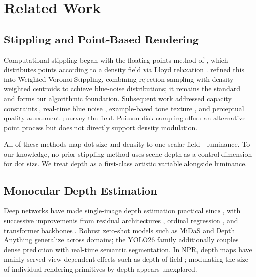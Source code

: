 \section{Related Work}
\label{sec:related}

\subsection{Stippling and Point-Based Rendering}

Computational stippling began with the floating-points method of
\citet{deussen2000floating}, which distributes points according to a
density field via Lloyd relaxation \citep{lloyd1982least}.
\citet{secord2002weighted} refined this into Weighted Voronoi
Stippling, combining rejection sampling with density-weighted
centroids to achieve blue-noise distributions; it remains the standard
and forms our algorithmic foundation. Subsequent work addressed
capacity constraints \citep{balzer2009capacity}, real-time blue noise
\citep{kopf2006recursive}, example-based tone texture
\citep{kim2009stippling,kim2008feature}, and perceptual quality
assessment \citep{spicker2017quantifying}; \citet{martin2017survey}
survey the field. Poisson disk sampling
\citep{bridson2007fast,ulichney1988dithering} offers an alternative
point process but does not directly support density modulation.

All of these methods map dot size and density to one scalar
field---luminance. To our knowledge, no prior stippling method uses
scene depth as a control dimension for dot size. We treat depth as a
first-class artistic variable alongside luminance.

\subsection{Monocular Depth Estimation}

Deep networks have made single-image depth estimation practical since
\citet{eigen2014depth}, with successive improvements from residual
architectures \citep{laina2016deeper}, ordinal regression
\citep{fu2018deep}, and transformer backbones
\citep{ranftl2021vision}. Robust zero-shot models such as MiDaS
\citep{ranftl2022towards} and Depth Anything \citep{yang2024depth}
generalize across domains; the YOLO26 family
\citep{ultralytics2025yolo26} additionally couples dense prediction
with real-time semantic segmentation. In NPR, depth maps have mainly
served view-dependent effects such as depth of field
\citep{winnemoller2006real}; modulating the size of individual
rendering primitives by depth appears unexplored.

